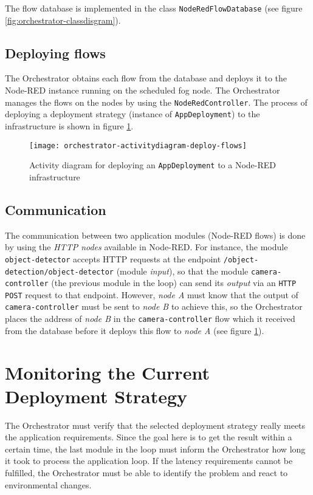 The flow database is implemented in the class \texttt{NodeRedFlowDatabase} (see figure \ref{fig:orchestrator-classdisgram}).

\subsection*{Deploying flows}
The Orchestrator obtains each flow from the database and deploys it to the Node-RED instance running on the scheduled fog node.
The Orchestrator manages the flows on the nodes by using the \texttt{NodeRedController}.
The process of deploying a deployment strategy (instance of \texttt{AppDeployment}) to the infrastructure is shown in figure \ref{fig:orchestrator-activitydiagram-deploy-flows}.

\begin{figure}[htb]
    \centering
    \texttt{[image: orchestrator-activitydiagram-deploy-flows]}
    \caption{Activity diagram for deploying an \texttt{AppDeployment} to a Node-RED infrastructure}
    \label{fig:orchestrator-activitydiagram-deploy-flows}
\end{figure}

\subsection*{Communication}
The communication between two application modules (Node-RED flows) is done by using the \textit{HTTP nodes} available in Node-RED.
For instance, the module \texttt{object-detector} accepts HTTP requests at the endpoint \texttt{/object-detection/object-detector} (module \textit{input}), so that the module \texttt{camera-controller} (the previous module in the loop) can send its \textit{output} via an \texttt{HTTP POST} request to that endpoint.
However, \textit{node A} must know that the output of \texttt{camera-controller} must be sent to \textit{node B} to achieve this, so the Orchestrator places the address of \textit{node B} in the \texttt{camera-controller} flow which it received from the database before it deploys this flow to \textit{node A} (see figure \ref{fig:orchestrator-activitydiagram-deploy-flows}).

\section{Monitoring the Current Deployment Strategy\label{sec:orchestrator-monitoring-deployment-strategy}}

The Orchestrator must verify that the selected deployment strategy really meets the application requirements.
Since the goal here is to get the result within a certain time, the last module in the loop must inform the Orchestrator how long it took to process the application loop.
If the latency requirements cannot be fulfilled, the Orchestrator must be able to identify the problem and react to environmental changes.

